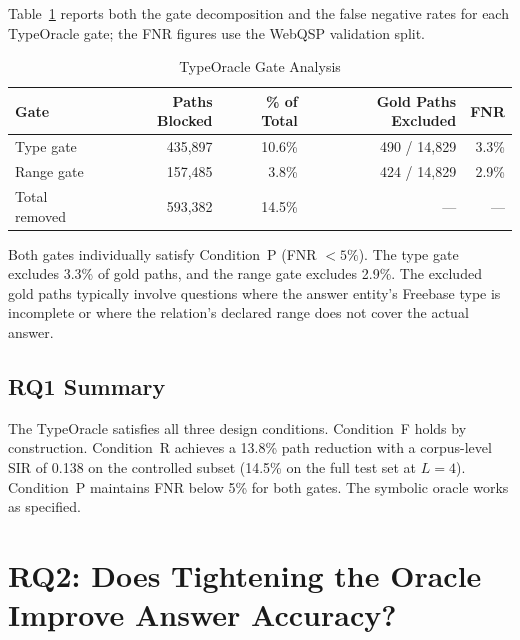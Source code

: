 Table~\ref{tab:gates} reports both the gate decomposition and the false negative rates for each TypeOracle gate; the FNR figures use the WebQSP validation split.

\begin{table}[H]
  \centering
  \caption[TypeOracle Gate Analysis]{TypeOracle Gate Analysis}
  \label{tab:gates}
  \begin{tabularx}{\textwidth}{|X|r|r|r|r|}
    \hline
    \textbf{Gate} & \textbf{Paths Blocked} & \textbf{\% of Total} & \textbf{Gold Paths Excluded} & \textbf{FNR} \\
    \hline
    Type gate     & 435,897                & 10.6\%               & 490 / 14,829                 & 3.3\%        \\
    \hline
    Range gate    & 157,485                & 3.8\%                & 424 / 14,829                 & 2.9\%        \\
    \hline
    Total removed & 593,382                & 14.5\%               & ---                          & ---          \\
    \hline
  \end{tabularx}
\end{table}

Both gates individually satisfy Condition~P (FNR $< 5\%$). The type gate excludes 3.3\% of gold paths, and the range gate excludes 2.9\%. The excluded gold paths typically involve questions where the answer entity's Freebase type is incomplete or where the relation's declared range does not cover the actual answer.

\subsection{RQ1 Summary}

The TypeOracle satisfies all three design conditions. Condition~F holds by construction. Condition~R achieves a 13.8\% path reduction with a corpus-level SIR of 0.138 on the controlled subset (14.5\% on the full test set at $L{=}4$). Condition~P maintains FNR below 5\% for both gates. The symbolic oracle works as specified.

\section{RQ2: Does Tightening the Oracle Improve Answer Accuracy?}
\label{sec:ch4accuracy}

